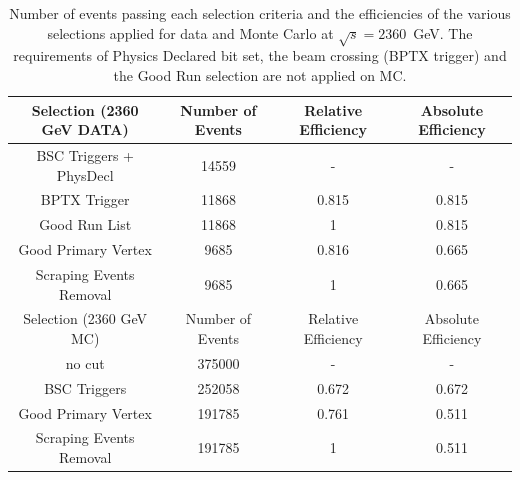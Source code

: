 \begin{table}[!ht]
  \begin{center}
    \begin{tabular}{|c|c|c|c|}
      \hline
      Selection (2360 GeV DATA) & Number of Events  & Relative Efficiency & Absolute Efficiency\\
      \hline\hline
      BSC Triggers + PhysDecl  & 14559             & -                   & -      \\ 
      BPTX Trigger             & 11868		   & 0.815               & 0.815  \\
      Good Run List            & 11868		   & 1		         & 0.815  \\
      Good Primary Vertex      & 9685		   & 0.816		 & 0.665  \\
      Scraping Events Removal  & 9685		   & 1			 & 0.665  \\
      \hline
      \hline
      \hline
      \hline
      Selection (2360 GeV MC)   & Number of Events  & Relative Efficiency & Absolute Efficiency\\
      \hline\hline
      no cut                   & 375000            & -                   & -      \\ 
      BSC Triggers	       & 252058		   & 0.672               & 0.672  \\ 
      Good Primary Vertex      & 191785		   & 0.761		 & 0.511  \\
      Scraping Events Removal  & 191785		   & 1			 & 0.511  \\
      \hline
  \end{tabular}
    \caption{Number of events passing each selection criteria and
      the efficiencies of the various selections applied for data and Monte Carlo at $\sqrt{s}=2360$~GeV. 
      The requirements of Physics Declared bit set, the beam crossing (BPTX trigger) and the Good Run selection 
      are not applied on MC.}
    \label{tab:selectionefficiency_2360}
  \end{center}
\end{table}



